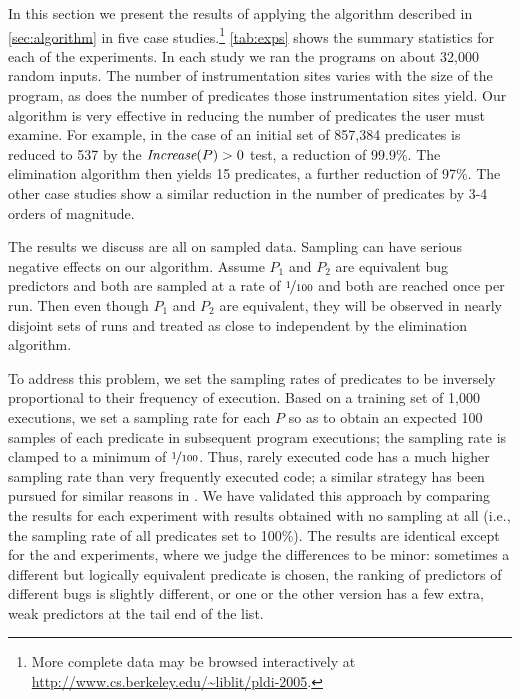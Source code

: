 


In this section we present the results of applying the algorithm
described in \autoref{sec:algorithm} in five case
studies.\footnote{More complete data may be browsed interactively at
  \url{http://www.cs.berkeley.edu/~liblit/pldi-2005}.}
\autoref{tab:exps} shows the summary statistics for each of the
experiments.  In each study we ran the programs on about 32,000 random
inputs.  The number of instrumentation sites varies with the size of
the program, as does the number of predicates those instrumentation
sites yield.  Our algorithm is very effective in reducing the number
of predicates the user must examine.  For example, in the case of
\rhythmbox an initial set of 857,384 predicates is reduced to 537 by the $\textit{Increase}(P) > 0$
test, a reduction of 99.9\%.  The elimination algorithm then yields 15 predicates, a further
reduction of 97\%.  The other case studies show a similar reduction in the number of
predicates by 3-4 orders of magnitude.

The results we discuss are all on sampled data.  Sampling can have
serious negative effects on our algorithm.  Assume $P_1$ and $P_2$ are
equivalent bug predictors and both are sampled at a rate of
$\nicefrac{1}{100}$ and both are reached once per run.  Then even though
$P_1$ and $P_2$ are equivalent, they will be observed in nearly disjoint
sets of runs and treated as close to independent by the elimination
algorithm.

To address this problem, we set the sampling rates of predicates to be
inversely proportional to their frequency of execution.  Based on a
training set of 1,000 executions, we set a sampling rate for each $P$ so 
as to obtain an expected 100 samples of each predicate in subsequent program 
executions; the sampling rate is clamped to a minimum of $\nicefrac{1}{100}$.  
Thus, rarely executed code has a
much higher sampling rate than very frequently executed code; a
similar strategy has been pursued for similar reasons in \cite{chil04}.  We
have validated this approach by comparing the results for each
experiment with results obtained with no sampling at all (i.e., the
sampling rate of all predicates set to 100\%).  The results are
identical except for the \rhythmbox and \moss experiments, where we
judge the differences to be minor: sometimes a different but logically
equivalent predicate is chosen, the ranking of predictors of different
bugs is slightly different, or one or the other version has a few
extra, weak predictors at the tail end of the list.  



